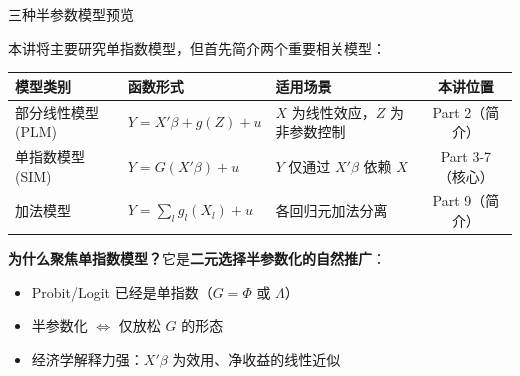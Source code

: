 \documentclass[aspectratio=169, 10pt]{beamer}
\begin{document}
\begin{frame}{三种半参数模型预览}

  本讲将主要研究单指数模型，但首先简介两个重要相关模型：

  \begin{center}\footnotesize
  \begin{tabular}{p{2.8cm}|p{4cm}|p{4.5cm}|c}
  \hline
  模型类别 & 函数形式 & 适用场景 & 本讲位置 \\
  \hline
  部分线性模型 (PLM) & $Y = X'\beta + g(Z) + u$ &
  $X$ 为线性效应，$Z$ 为非参数控制 & Part 2（简介）\\
  \hline
  单指数模型 (SIM) & $Y = G(X'\beta) + u$ &
  $Y$ 仅通过 $X'\beta$ 依赖 $X$ & Part 3-7（核心）\\
  \hline
  加法模型 & $Y = \sum_l g_l(X_l) + u$ &
  各回归元加法分离 & Part 9（简介）\\
  \hline
  \end{tabular}
  \end{center}

  \begin{keybox}
    \textbf{为什么聚焦单指数模型？}它是\textbf{二元选择半参数化的自然推广}：
    \begin{itemize}\setlength{\itemsep}{1pt}
      \item Probit/Logit 已经是单指数（$G = \Phi$ 或 $\Lambda$）
      \item 半参数化 $\Leftrightarrow$ 仅放松 $G$ 的形态
      \item 经济学解释力强：$X'\beta$ 为效用、净收益的线性近似
    \end{itemize}
  \end{keybox}

\end{frame}
\end{document}

